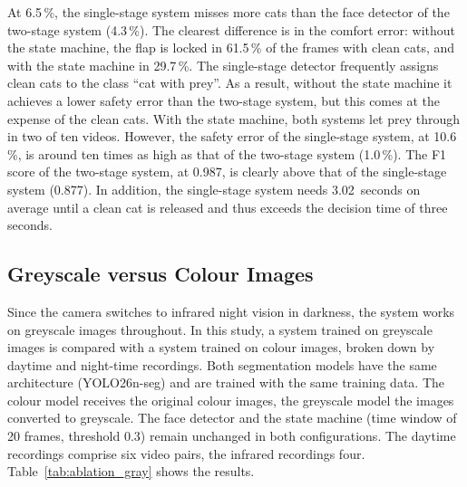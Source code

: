 At 6.5\,\%, the single-stage system misses more cats than the face detector of the two-stage system (4.3\,\%). The clearest difference is in the comfort error: without the state machine, the flap is locked in 61.5\,\% of the frames with clean cats, and with the state machine in 29.7\,\%. The single-stage detector frequently assigns clean cats to the class ``cat with prey''. As a result, without the state machine it achieves a lower safety error than the two-stage system, but this comes at the expense of the clean cats. With the state machine, both systems let prey through in two of ten videos. However, the safety error of the single-stage system, at 10.6\,\%, is around ten times as high as that of the two-stage system (1.0\,\%). The F1 score of the two-stage system, at 0.987, is clearly above that of the single-stage system (0.877). In addition, the single-stage system needs 3.02~seconds on average until a clean cat is released and thus exceeds the decision time of three seconds.

\subsection{Greyscale versus Colour Images}
Since the camera switches to infrared night vision in darkness, the system works on greyscale images throughout. In this study, a system trained on greyscale images is compared with a system trained on colour images, broken down by daytime and night-time recordings.
Both segmentation models have the same architecture (YOLO26n-seg) and are trained with the same training data. The colour model receives the original colour images, the greyscale model the images converted to greyscale. The face detector and the state machine (time window of 20 frames, threshold 0.3) remain unchanged in both configurations. The daytime recordings comprise six video pairs, the infrared recordings four. Table~\ref{tab:ablation_gray} shows the results.

